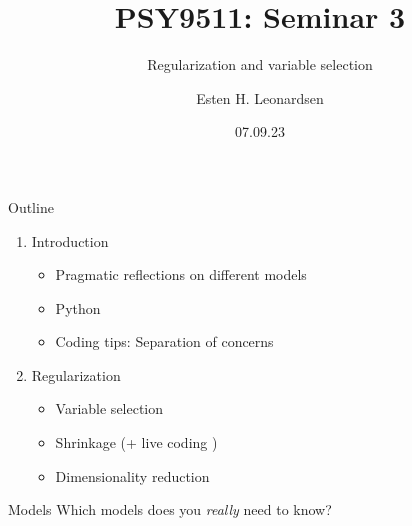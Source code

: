 \documentclass[8pt]{beamer}
\title{PSY9511: Seminar 3}
\subtitle{Regularization and variable selection}
\author{Esten H. Leonardsen}
\date{07.09.23}
\begin{document}
	\begin{frame}
	 	\maketitle
	\end{frame}

    \begin{frame}{Outline}
        \centering
        \vfill
        \begin{enumerate}
            \item Introduction
            \begin{itemize}
                \item Pragmatic reflections on different models
                \item Python
                \item Coding tips: Separation of concerns
            \end{itemize}
            \item Regularization
            \begin{itemize}
                \item Variable selection
                \item Shrinkage (+ live coding )
                \item Dimensionality reduction
            \end{itemize}
        \end{enumerate}
        \vfill
    \end{frame}

    \def\codewidth{4.5cm}

    \begin{frame}{Models}
        \vfill
        \centering
        Which models does you \textit{really} need to know?
        \vfill
    \end{frame}
\end{document}
